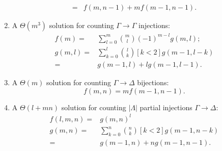 \documentclass{article}
\begin{document}
\begin{enumerate}
\begin{align*}
          ={}& f(m, n-1) + mf(m-1, n-1).
        \end{align*}
  \item A $\Theta(m^{3})$ solution for counting $\Gamma \to \Gamma$ injections:
        \begin{align*}
          f(m) ={}& \sum_{l=0}^{m} \binom{m}{l} {(-1)}^{m-l} g(m, l); \\
          g(m, l) ={}& \sum_{k=0}^{l} \binom{l}{k} [k < 2] g(m - 1, l - k)\\
          ={}& g(m - 1, l) + lg(m - 1, l - 1).
        \end{align*}
  \item A $\Theta(m)$ solution for counting $\Gamma \to \Delta$ bijections:
        \[
        f(m, n) = mf(m-1, n-1).
        \]
  \item A $\Theta(l+mn)$ solution for counting $|\Lambda|$ partial injections
        $\Gamma \to \Delta$:
        \begin{align*}
          f(l, m, n) ={}& {g(m, n)}^{l}\\
          g(m, n) ={}& \sum_{k=0}^{n}\binom{n}{k} [k < 2] g(m-1, n-k)\\
          ={}& g(m-1, n) + ng(m-1, n-1).
        \end{align*}
\end{enumerate}
\end{document}
